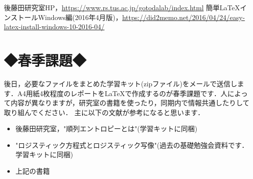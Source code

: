 \documentclass[autodetect-engine,dvipdfmx-if-dvi,ja=standard,a4paper,11pt]{bxjsarticle} %
\begin{document}
\begin{thebibliography}{9999}
後藤田研究室HP，\url{https://www.rs.tus.ac.jp/gotodalab/index.html}
簡単LaTeXインストールWindows編(2016年4月版)，\url{https://did2memo.net/2016/04/24/easy-latex-install-windows-10-2016-04/}
\end{thebibliography}
\newpage

\section*{◆春季課題◆}
後日，必要なファイルをまとめた学習キット(zipファイル)をメールで送信します．A4用紙4枚程度のレポートを\LaTeX で作成するのが春季課題です．人によって内容が異なりますが，研究室の書籍を使ったり，同期内で情報共通したりして取り組んでください．
主に以下の文献が参考になると思います．
\begin{itemize}
\item 後藤田研究室，"順列エントロピーとは"(学習キットに同梱)
\item "ロジスティック方程式とロジスティック写像"(過去の基礎勉強会資料です．学習キットに同梱)
\item  上記の書籍
\end{itemize}
\end{document}

